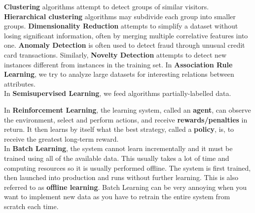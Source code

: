     \noindent \textbf{Clustering} algorithms attempt to detect groups of similar visitors.
    \textbf{Hierarchical clustering} algorithms may subdivide each group into smaller groups.
    \textbf{Dimensionality Reduction} attempts to simplify a dataset without losing significant information,
    often by merging multiple correlative features into one. \textbf{Anomaly Detection} is often used to detect
    fraud through unusual credit card transactions. Similarly, \textbf{Novelty Detection} attempts to detect
    new instances different from instances in the training set. In \textbf{Association Rule Learning}, we try
    to analyze large datasets for interesting relations between attributes. \\

    \noindent In \textbf{Semisupervised Learning}, we feed algorithms partially-labelled data. \\

    \pagebreak

    \noindent In \textbf{Reinforcement Learning}, the learning system, called an \textbf{agent}, can observe
    the environment, select and perform actions, and receive \textbf{rewards/penalties} in return. It then
    learns by itself what the best strategy, called a \textbf{policy}, is, to receive the greatest long-term
    reward. \\

    \noindent In \textbf{Batch Learning}, the system cannot learn incrementally and it must be trained using
    all of the available data. This usually takes a lot of time and computing resources so it is usually
    performed offline. The system is first trained, then launched into production and runs without further
    learning. This is also referred to as \textbf{offline learning}. Batch Learning can be very annoying
    when you want to implement new data as you have to retrain the entire system from scratch each time. \\

